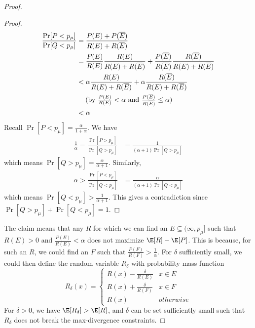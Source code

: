 \begin{proof}
\begin{proof}
\begin{align*}
    \frac{\Pr[P < p_\mu]}{\Pr[Q < p_\mu]} &= \frac{P(E) + P(\overline{E}) }{R(E) + R(\overline{E})} \\
    &= \frac{P(E)}{R(E)} \frac{R(E)}{R(E) + R(\overline{E})}
    + \frac{P(\overline{E})}{R(\overline{E})} \frac{R(\overline{E})}{R(E) + R(\overline{E})}\\
    &<  \alpha \frac{R(E)}{R(E) + R(\overline{E})}
    + \alpha \frac{R(\overline{E})}{R(E) + R(\overline{E})}\\
    &\hspace{4.5mm} \text{(by $\textstyle{\frac{P(E)}{R(E)} < \alpha}$ and $\textstyle{\frac{P(\overline{E})}{R(\overline{E})} \leq \alpha}$)}\\
    &< \alpha
\end{align*}
Recall $\Pr[P < p_\mu] = \frac{\alpha}{1+\alpha}$. We have
\begin{align*}
    \frac{1}{\alpha} = \frac{\Pr[P > p_\mu]}{\Pr[Q > p_\mu]} &= \frac{1}{(\alpha+1)\Pr[Q > p_\mu]}
\end{align*}
which means $\Pr[Q > p_\mu] = \frac{\alpha}{\alpha+1}$. Similarly,
\begin{align*}
    \alpha > \frac{\Pr[P < p_\mu]}{\Pr[Q < p_\mu]} &= \frac{\alpha}{(\alpha+1)\Pr[Q < p_\mu]}
\end{align*}
which means $\Pr[Q < p_\mu] > \frac{1}{\alpha+1}$. This gives a contradiction since $\Pr[Q > p_\mu] + \Pr[Q < p_\mu] = 1$.

\end{proof}

The claim means that any $R$ for which we can find an $E \subseteq (\infty,
p_\mu]$ such that $R(E) > 0$ and $\frac{P(E)}{R(E)} < \alpha$ does not maximize
$\E[R] - \E[P]$. This is because, for such an $R$, we could find an $F$ such
that $\frac{P(F)}{R(F)} > \frac{1}{\alpha}$. For $\delta$ sufficiently small, we
could then define the random variable $R_\delta$ with probability mass function
\[
    R_\delta(x) = \begin{cases} R(x)  - \frac{\delta}{R(E)} & x \in E \\ 
                                R(x) + \frac{\delta}{R(F)} & x \in F \\
                                R(x) & otherwise \end{cases}
\]
For $\delta > 0$, we have $\E[R_\delta] > \E[R]$, and $\delta$ can be set sufficiently small such that $R_\delta$ does not break the max-divergence constraints.


\end{proof}
